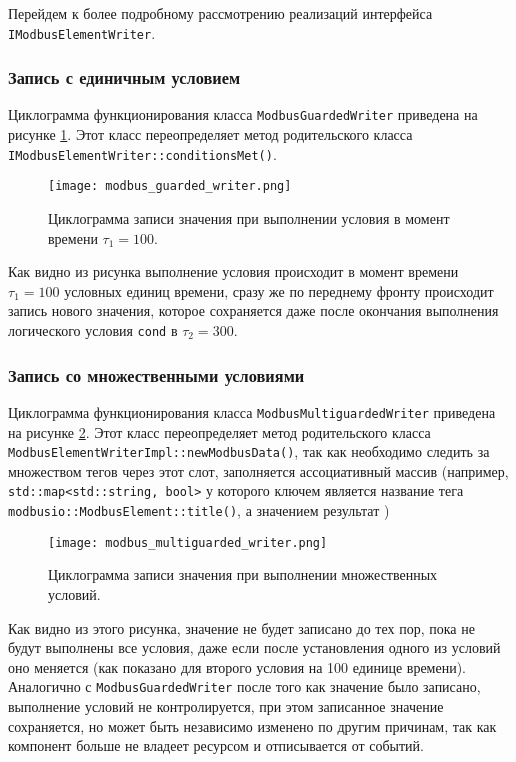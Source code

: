 Перейдем к более подробному рассмотрению реализаций интерфейса \texttt{IModbusElementWriter}.

\subsubsection{Запись с единичным условием}\label{sec:guard}
Циклограмма функционирования класса \texttt{ModbusGuardedWriter} приведена на рисунке \ref{fig:modbus_guarded_writed}.
Этот класс переопределяет метод родительского класса \texttt{IModbusElementWriter::conditionsMet()}.
\begin{center}
    \begin{figure}[h!]
        \texttt{[image: modbus\_guarded\_writer.png]}
        \caption{Циклограмма записи значения при выполнении условия в момент времени $\tau_1=100$.}\label{fig:modbus_guarded_writed}
    \end{figure}
\end{center}
Как видно из рисунка выполнение условия происходит в момент времени $\tau_1=100$ условных единиц времени,
сразу же по переднему фронту происходит запись нового значения, которое сохраняется даже после окончания
выполнения логического условия \texttt{cond} в $\tau_2=300$.


\subsubsection{Запись со множественными условиями}
Циклограмма функционирования класса \texttt{ModbusMultiguardedWriter} приведена на рисунке \ref{fig:modbus_multiguarded_writed}.
Этот класс переопределяет метод родительского класса \texttt{ModbusElementWriterImpl::newModbusData()},
так как необходимо следить за множеством тегов через этот слот,
заполняется ассоциативный массив (например, \texttt{std::map<std::string, bool>} у которого ключем является
название тега \texttt{modbusio::ModbusElement::title()}, а значением результат )
\begin{center}
    \begin{figure}[h!]
        \texttt{[image: modbus\_multiguarded\_writer.png]}
        \caption{Циклограмма записи значения при выполнении множественных условий.}\label{fig:modbus_multiguarded_writed}
    \end{figure}
\end{center}
Как видно из этого рисунка, значение не будет записано до тех пор, пока не будут
выполнены все условия, даже если после установления одного из условий оно меняется
(как показано для второго условия на 100 единице времени). Аналогично с \texttt{ModbusGuardedWriter}
после того как значение было записано, выполнение условий не контролируется, 
при этом записанное значение сохраняется, но может быть независимо изменено по другим причинам,
так как компонент больше не владеет ресурсом и отписывается от событий.


